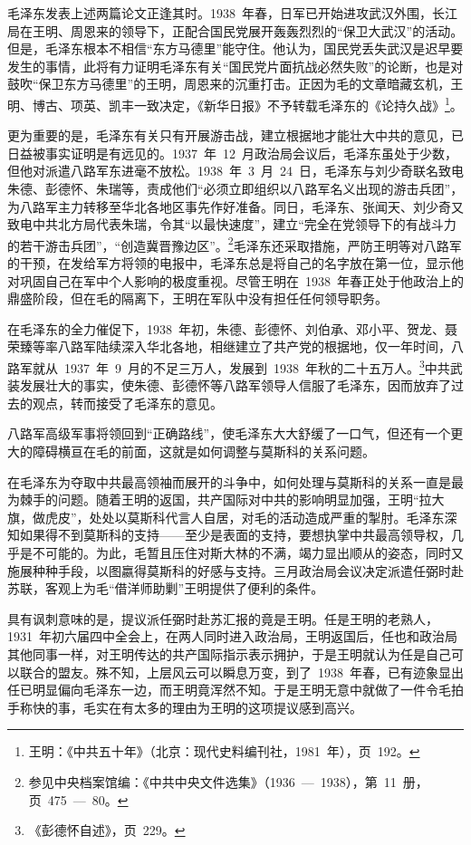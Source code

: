 毛泽东发表上述两篇论文正逢其时。1938~年春，日军已开始进攻武汉外围，长江局在王明、周恩来的领导下，正配合国民党展开轰轰烈烈的“保卫大武汉”的活动。但是，毛泽东根本不相信“东方马德里”能守住。他认为，国民党丢失武汉是迟早要发生的事情，此将有力证明毛泽东有关“国民党片面抗战必然失败”的论断，也是对鼓吹“保卫东方马德里”的王明，周恩来的沉重打击。正因为毛的文章暗藏玄机，王明、博古、项英、凯丰一致决定，《新华日报》不予转载毛泽东的《论持久战》\footnote{王明：《中共五十年》（北京：现代史料编刊社，1981~年），页~192。}。

更为重要的是，毛泽东有关只有开展游击战，建立根据地才能壮大中共的意见，已日益被事实证明是有远见的。1937~年~12~月政治局会议后，毛泽东虽处于少数，但他对派遣八路军东进毫不放松。1938~年~3~月~24~日，毛泽东与刘少奇联名致电朱德、彭德怀、朱瑞等，责成他们“必须立即组织以八路军名义出现的游击兵团”，为八路军主力转移至华北各地区事先作好准备。同日，毛泽东、张闻天、刘少奇又致电中共北方局代表朱瑞，令其“以最快速度”，建立“完全在党领导下的有战斗力的若干游击兵团”，“创造冀晋豫边区”。\footnote{参见中央档案馆编：《中共中央文件选集》（1936~—~1938），第~11~册，页~475~—~80。}毛泽东还采取措施，严防王明等对八路军的干预，在发给军方将领的电报中，毛泽东总是将自己的名字放在第一位，显示他对巩固自己在军中个人影响的极度重视。尽管王明在~1938~年春正处于他政治上的鼎盛阶段，但在毛的隔离下，王明在军队中没有担任任何领导职务。

在毛泽东的全力催促下，1938~年初，朱德、彭德怀、刘伯承、邓小平、贺龙、聂荣臻等率八路军陆续深入华北各地，相继建立了共产党的根据地，仅一年时间，八路军就从~1937~年~9~月的不足三万人，发展到~1938~年秋的二十五万人。\footnote{《彭德怀自述》，页~229。}中共武装发展壮大的事实，使朱德、彭德怀等八路军领导人信服了毛泽东，因而放弃了过去的观点，转而接受了毛泽东的意见。

八路军高级军事将领回到“正确路线”，使毛泽东大大舒缓了一口气，但还有一个更大的障碍横亘在毛的前面，这就是如何调整与莫斯科的关系问题。

在毛泽东为夺取中共最高领袖而展开的斗争中，如何处理与莫斯科的关系一直是最为棘手的问题。随着王明的返国，共产国际对中共的影响明显加强，王明“拉大旗，做虎皮”，处处以莫斯科代言人自居，对毛的活动造成严重的掣肘。毛泽东深知如果得不到莫斯科的支持——至少是表面的支持，要想执掌中共最高领导权，几乎是不可能的。为此，毛暂且压住对斯大林的不满，竭力显出顺从的姿态，同时又施展种种手段，以图嬴得莫斯科的好感与支持。三月政治局会议决定派遣任弼时赴苏联，客观上为毛“借洋师助剿”王明提供了便利的条件。

具有讽刺意味的是，提议派任弼时赴苏汇报的竟是王明。任是王明的老熟人，1931~年初六届四中全会上，在两人同时进入政治局，王明返国后，任也和政治局其他同事一样，对王明传达的共产国际指示表示拥护，于是王明就认为任是自己可以联合的盟友。殊不知，上层风云可以瞬息万变，到了~1938~年春，已有迹象显出任已明显偏向毛泽东一边，而王明竟浑然不知。于是王明无意中就做了一件令毛拍手称快的事，毛实在有太多的理由为王明的这项提议感到高兴。

